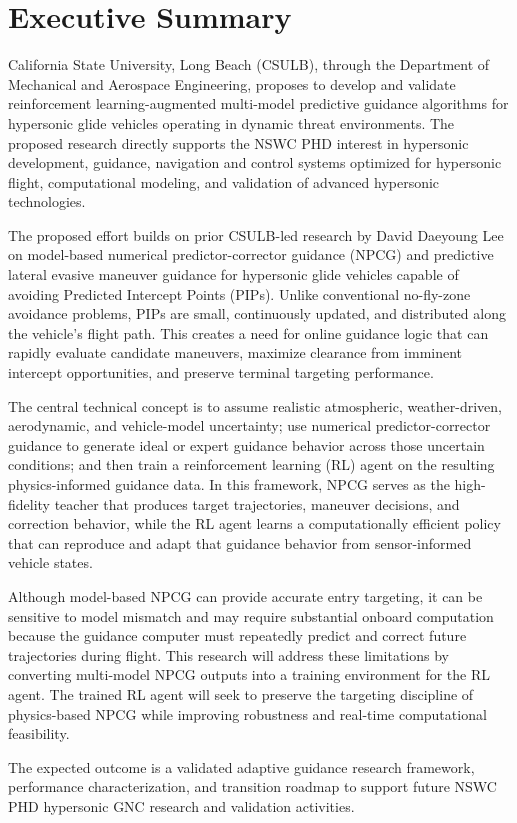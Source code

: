 \section{Executive Summary}

California State University, Long Beach (CSULB), through the Department of Mechanical and Aerospace Engineering, proposes to develop and validate reinforcement learning-augmented multi-model predictive guidance algorithms for hypersonic glide vehicles operating in dynamic threat environments. The proposed research directly supports the NSWC PHD interest in hypersonic development, guidance, navigation and control systems optimized for hypersonic flight, computational modeling, and validation of advanced hypersonic technologies.

The proposed effort builds on prior CSULB-led research by David Daeyoung Lee on model-based numerical predictor-corrector guidance (NPCG) and predictive lateral evasive maneuver guidance for hypersonic glide vehicles capable of avoiding Predicted Intercept Points (PIPs). Unlike conventional no-fly-zone avoidance problems, PIPs are small, continuously updated, and distributed along the vehicle's flight path. This creates a need for online guidance logic that can rapidly evaluate candidate maneuvers, maximize clearance from imminent intercept opportunities, and preserve terminal targeting performance.

The central technical concept is to assume realistic atmospheric, weather-driven, aerodynamic, and vehicle-model uncertainty; use numerical predictor-corrector guidance to generate ideal or expert guidance behavior across those uncertain conditions; and then train a reinforcement learning (RL) agent on the resulting physics-informed guidance data. In this framework, NPCG serves as the high-fidelity teacher that produces target trajectories, maneuver decisions, and correction behavior, while the RL agent learns a computationally efficient policy that can reproduce and adapt that guidance behavior from sensor-informed vehicle states.

Although model-based NPCG can provide accurate entry targeting, it can be sensitive to model mismatch and may require substantial onboard computation because the guidance computer must repeatedly predict and correct future trajectories during flight. This research will address these limitations by converting multi-model NPCG outputs into a training environment for the RL agent. The trained RL agent will seek to preserve the targeting discipline of physics-based NPCG while improving robustness and real-time computational feasibility.

The expected outcome is a validated adaptive guidance research framework, performance characterization, and transition roadmap to support future NSWC PHD hypersonic GNC research and validation activities.
